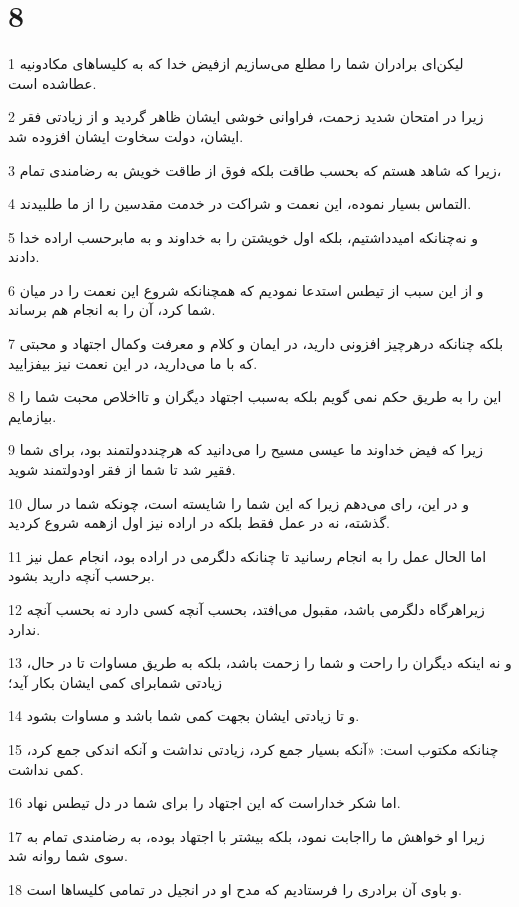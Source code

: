 \chapter{8}

\par 1 لیکن‌ای برادران شما را مطلع می‌سازیم ازفیض خدا که به کلیساهای مکادونیه عطاشده است.
\par 2 زیرا در امتحان شدید زحمت، فراوانی خوشی ایشان ظاهر گردید و از زیادتی فقر ایشان، دولت سخاوت ایشان افزوده شد.
\par 3 زیرا که شاهد هستم که بحسب طاقت بلکه فوق از طاقت خویش به رضامندی تمام،
\par 4 التماس بسیار نموده، این نعمت و شراکت در خدمت مقدسین را از ما طلبیدند.
\par 5 و نه‌چنانکه امیدداشتیم، بلکه اول خویشتن را به خداوند و به مابرحسب اراده خدا دادند.
\par 6 و از این سبب از تیطس استدعا نمودیم که همچنانکه شروع این نعمت را در میان شما کرد، آن را به انجام هم برساند.
\par 7 بلکه چنانکه درهرچیز افزونی دارید، در ایمان و کلام و معرفت وکمال اجتهاد و محبتی که با ما می‌دارید، در این نعمت نیز بیفزایید.
\par 8 این را به طریق حکم نمی گویم بلکه به‌سبب اجتهاد دیگران و تااخلاص محبت شما را بیازمایم.
\par 9 زیرا که فیض خداوند ما عیسی مسیح را می‌دانید که هرچنددولتمند بود، برای شما فقیر شد تا شما از فقر اودولتمند شوید.
\par 10 و در این، رای می‌دهم زیرا که این شما را شایسته است، چونکه شما در سال گذشته، نه در عمل فقط بلکه در اراده نیز اول ازهمه شروع کردید.
\par 11 اما الحال عمل را به انجام رسانید تا چنانکه دلگرمی در اراده بود، انجام عمل نیز برحسب آنچه دارید بشود.
\par 12 زیراهرگاه دلگرمی باشد، مقبول می‌افتد، بحسب آنچه کسی دارد نه بحسب آنچه ندارد.
\par 13 و نه اینکه دیگران را راحت و شما را زحمت باشد، بلکه به طریق مساوات تا در حال، زیادتی شمابرای کمی ایشان بکار آید؛
\par 14 و تا زیادتی ایشان بجهت کمی شما باشد و مساوات بشود.
\par 15 چنانکه مکتوب است: «آنکه بسیار جمع کرد، زیادتی نداشت و آنکه اندکی جمع کرد، کمی نداشت.
\par 16 اما شکر خداراست که این اجتهاد را برای شما در دل تیطس نهاد.
\par 17 زیرا او خواهش ما رااجابت نمود، بلکه بیشتر با اجتهاد بوده، به رضامندی تمام به سوی شما روانه شد.
\par 18 و باوی آن برادری را فرستادیم که مدح او در انجیل در تمامی کلیساها است.

